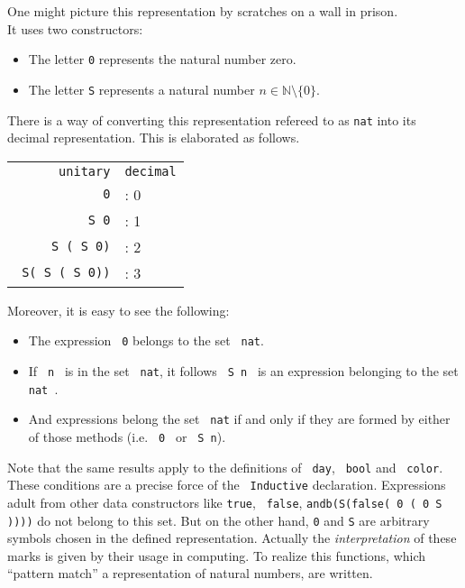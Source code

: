   One might picture this representation by scratches on a wall in prison. \\
  It uses two constructors: 
  \begin{itemize}
  \item The letter \lstinline!0! represents the natural number zero. 
  \item The letter \lstinline!S! represents a natural number $n\in\mathbb{N}\setminus\{ 0\}$.  
  \end{itemize}
  There is a way of converting this representation refereed to as \lstinline!nat! into its decimal representation. This is elaborated as follows.
  \begin{example}
  
	  \begin{tabular} {r l}
	  
		  \texttt{unitary}				& \texttt{decimal}	\\
		  \texttt{\lstinline!0!} 		&: 0 				\\
		  \texttt{\lstinline! S 0!}  	&: 1				\\
		  \texttt{\lstinline! S ( S 0)!}	&: 2				\\
		  \texttt{\lstinline! S( S ( S 0))!}	&: 3				\\
		    
	  \end{tabular}
  \end{example}
  Moreover, it is easy to see the following: 
  \begin{itemize}
  \item The expression \lstinline! 0! belongs to the set \lstinline! nat!.
  \item If \lstinline! n ! is in the set \lstinline! nat!, it follows \lstinline! S n ! is an expression belonging to the set \lstinline! nat !.
  \item And expressions belong the set \lstinline! nat! if and only if they are  formed by either of those methods (i.e. \lstinline! 0 ! or  \lstinline! S n!). 
  \end{itemize}
  
  
  Note that the same results apply to the definitions of \lstinline! day!, \lstinline! bool! and \lstinline! color!.
  These conditions are a precise force of the \lstinline! Inductive! declaration. 
  Expressions adult from other data constructors like \lstinline!true!, \lstinline! false!, \lstinline!andb(S(false( 0 ( 0 S ))))! do not belong to this set.  
  But on the other hand, \lstinline!0! and \lstinline!S! are arbitrary symbols chosen in the defined representation. 
  Actually the {\itshape interpretation} of these marks is given by their usage in computing.
  To realize this functions, which ``pattern match'' a representation of natural numbers, are written.
  
